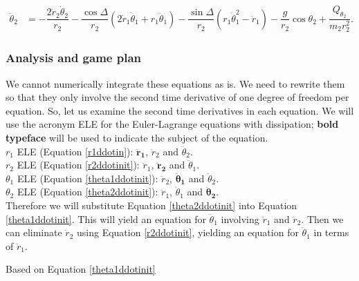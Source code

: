 \documentclass[12pt,a4paper,portrait]{article}
\newcommand{\eq}[1]{Equation \eqref{#1}}
\begin{document}
\begin{landscape}
\begin{align}
	\ddot{\theta}_2 &= -\dfrac{2\dot{r}_2\dot{\theta}_2}{r_2} - \dfrac{\cos{\Delta}}{r_2}(2\dot{r}_1\dot{\theta}_1+r_1\ddot{\theta}_1) - \dfrac{\sin{\Delta}}{r_2}(r_1\dot{\theta}_1^2 - \ddot{r}_1) - \dfrac{g}{r_2}\cos{\theta_2} + \dfrac{Q_{\theta_2}}{m_2r_2^2}.\label{theta2ddotinit}
\end{align}

\subsubsection{Analysis and game plan}
We cannot numerically integrate these equations as is. We need to rewrite them so that they only involve the second time derivative of one degree of freedom per equation. So, let us examine the second time derivatives in each equation. We will use the acronym ELE for the Euler-Lagrange equations with dissipation; \textbf{bold typeface} will be used to indicate the subject of the equation. \\

$r_1$ ELE (\eq{r1ddotin}): $\mathbf{\ddot{r}_1}$, $\ddot{r}_2$ and $\ddot{\theta}_2$.\\
$r_2$ ELE (\eq{r2ddotinit}): $\ddot{r}_1$, $\mathbf{\ddot{r}_2}$ and $\ddot{\theta}_1$.\\
$\theta_1$ ELE (\eq{theta1ddotinit}): $\ddot{r}_2$, $\boldsymbol{\ddot{\theta}_1}$ and $\ddot{\theta}_2$.\\
$\theta_2$ ELE (\eq{theta2ddotinit}): $\ddot{r}_1$, $\ddot{\theta}_1$ and $\boldsymbol{\ddot{\theta}_2}$.\\

Therefore we will substitute \eq{theta2ddotinit} into \eq{theta1ddotinit}. This will yield an equation for $\ddot{\theta}_1$ involving $\ddot{r}_1$ and $\ddot{r}_2$. Then we can eliminate $\ddot{r}_2$ using \eq{r2ddotinit}, yielding an equation for $\ddot{\theta}_1$ in terms of $\ddot{r}_1$.

Based on \eq{theta1ddotinit}


\end{landscape}
\end{document}
